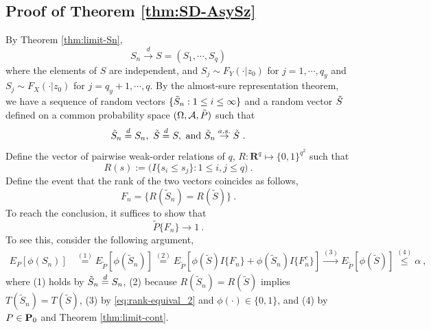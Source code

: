 \documentclass[11pt]{article}
\numberwithin{equation}{section}
\begin{document}
\subsection{Proof of Theorem \ref{thm:SD-AsySz}}
By Theorem \ref{thm:limit-Sn}, 
\begin{equation*}
S_{n}\overset{d}{\to }S=(S_{1},\cdots ,S_{q})
\end{equation*}
where the elements of $S$ are independent, and $S_{j}\sim F_{Y}(\cdot |z_{0})$ for $j=1,\cdots ,q_{y}$ and $S_{j}\sim F_{X}(\cdot |z_{0})$ for $ j=q_{y}+1,\cdots
,q$. By the almost-sure representation theorem, we have a sequence of random vectors $\{\Tilde{S}_{n}: 1\le i\le \infty \}$ and a random vector $\Tilde{S}$ defined on a
common probability space $(\Omega ,\mathcal{A },\Tilde{P})$ such that
\begin{equation*}
\Tilde{S}_{n}\overset{d}{=}S_{n},~\Tilde{S}\overset{d}{=}S,\text{ and } \Tilde{S}_{n}\overset{a.s.}{\to }\Tilde{S}~.
\end{equation*}
Define the vector of pairwise weak-order relations of $q$,  $R:\mathbf R^q\mapsto \{0,1\}^{q^2}$ such that $$R(s):=\big(I\{s_i\leq s_j\}: 1\leq i,j\leq q\big)~.$$
Define the event that the rank of the two vectors coincides as follows,
\begin{equation*}
    F_{n}=\{R(\tilde{S}_{n})=R(\tilde{S})\}~.
\end{equation*}
To reach the conclusion, it suffices to show that
\begin{equation}\label{eq:rank-equival_2}
\tilde{P}\{F_{n}\}\to 1~.  
\end{equation}
To see this, consider the following argument,
\begin{align*}
E_{P}[\phi (S_{n})]& \overset{(1)}{=} E_{\tilde{P}}[\phi (\tilde{S}_{n})]
 \overset{(2)}{=} E_{\tilde{P}}[\phi (\tilde{S})I\{F_{n}\}+\phi (\tilde{S} _{n})I\{F_{n}^{c}\}] 
 \overset{(3)}{\to} E_{\tilde{P}}[\phi (\tilde{S})]  \overset{(4)}{\leq} \alpha~,
\end{align*}
where (1) holds by $\Tilde{S}_{n}\overset{d}{=}S_{n}$, (2) because $R(\tilde{S}_n)=R(\tilde{S})$ implies $T(\tilde{S}_n)=T(\tilde{S})$, (3) by \eqref{eq:rank-equival_2} and $\phi(\cdot)\in \{0,1\}$, and (4) by $P \in {\bf P}_0$ and Theorem \ref{thm:limit-cont}.
\end{document}
